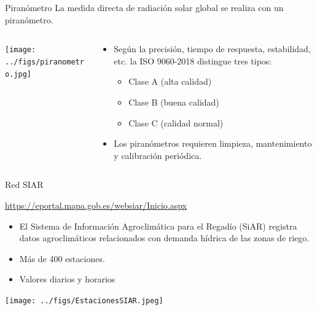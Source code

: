 \documentclass[aspectratio=169, usenames,svgnames,dvipsnames]{beamer}
\begin{document}
\begin{frame}[label={sec:orgb41d733}]{Piranómetro}
La medida directa de radiación solar global se realiza con un piranómetro.
\begin{columns}
\begin{column}{0.4\columnwidth}
\begin{center}
\begin{center}
\texttt{[image: ../figs/piranometro.jpg]}
\end{center}
\end{center}
\end{column}
\begin{column}{0.6\columnwidth}
\begin{itemize}
\item Según la precisión, tiempo de respuesta, estabilidad, etc. la ISO 9060-2018 distingue tres tipos:
\begin{itemize}
\item Clase A (alta calidad)
\item Clase B (buena calidad)
\item Clase C (calidad normal)
\end{itemize}
\item Los piranómetros requieren limpieza, mantenimiento y calibración periódica.
\end{itemize}
\end{column}
\end{columns}
\end{frame}



\begin{frame}[label={sec:org9ef7941}]{Red SIAR}
\begin{block}{\url{https://eportal.mapa.gob.es/websiar/Inicio.aspx}}
\begin{itemize}
\item El Sistema de Información Agroclimática para el Regadío (SiAR)
registra datos agroclimáticos relacionados con demanda hídrica de
las zonas de riego.

\item Más de 400 estaciones.

\item Valores diarios y horarios
\end{itemize}

\begin{center}
\begin{center}
\texttt{[image: ../figs/EstacionesSIAR.jpeg]}
\end{center}
\end{center}
\end{block}
\end{frame}
\end{document}
